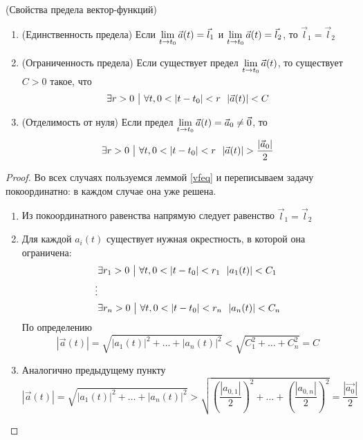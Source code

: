 \begin{theorem} (Свойства предела вектор-функций)
	\begin{enumerate}
		\item (Единственность предела) Если $\lim\limits_{t \to t_0} \vec{a}(t) = \vec{l}_1$ и $\lim\limits_{t \to t_0} \vec{a}(t) = \vec{l}_2$, то $\vec{l}_1 = \vec{l}_2$
		
		\item (Ограниченность предела) Если существует предел $\lim\limits_{t \to t_0} \vec{a}(t)$, то существует $C > 0$ такое, что
		\[
			\exists r > 0 \ \big|\  \forall t, 0 < |t - t_0| < r\ \ |\vec{a}(t)| < C
		\]
		
		\item (Отделимость от нуля) Если предел $\lim\limits_{t \to t_0} \vec{a}(t) = \vec{a}_0 \neq \vec{0}$, то
		\[
			\exists r > 0 \ \big|\  \forall t, 0 < |t - t_0| < r\ \ |\vec{a}(t)| > \frac{|\vec{a}_0|}{2}
		\]
	\end{enumerate}
\end{theorem}

\begin{proof}
	Во всех случаях пользуемся леммой \ref{vfeq} и переписываем задачу покоординатно: в каждом случае она уже решена.
\begin{enumerate}
	\item Из покоординатного равенства напрямую следует равенство $\vec{l}_1 = \vec{l}_2$
	
	\item Для каждой $a_i(t)$ существует нужная окрестность, в которой она ограничена:
	\begin{align*}
		&{\exists r_1 > 0 \ \big|\  \forall t, 0 < |t - t_0| < r_1\ \ |a_1(t)| < C_1}
		\\
		\vdots
		\\
		&{\exists r_n > 0 \ \big|\  \forall t, 0 < |t - t_0| < r_n\ \ |a_n(t)| < C_n}
	\end{align*}
	По определению
	\[
		|\vec{a}(t)| = \sqrt{|a_1(t)|^2 + \ldots + |a_n(t)|^2} < \sqrt{C_1^2 + \ldots + C_n^2} = C
	\]
	
	\item Аналогично предыдущему пункту
	\[
		|\vec{a}(t)| = \sqrt{|a_1(t)|^2 + \ldots + |a_n(t)|^2} > \sqrt{\left(\frac{|a_{0, 1}|}{2}\right)^2 + \ldots + \left(\frac{|a_{0, n}|}{2}\right)^2} = \frac{|\vec{a_0}|}{2}
	\]
\end{enumerate}
\end{proof}

